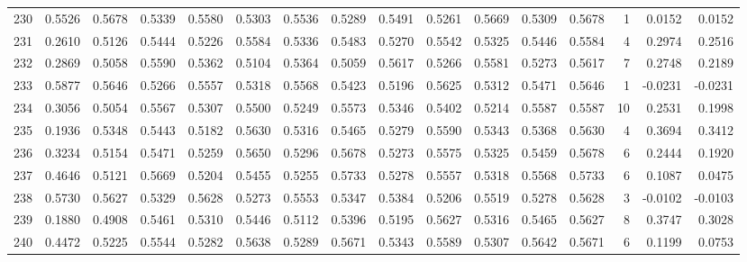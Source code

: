 \begin{tabular}{lrrrrrrrrrrrrrrr}
230 &      0.5526 &  0.5678 &  0.5339 &  0.5580 &  0.5303 &  0.5536 &  0.5289 &  0.5491 &  0.5261 &  0.5669 &   0.5309 &     0.5678 &      1 &                    0.0152 &                     0.0152 \\
231 &      0.2610 &  0.5126 &  0.5444 &  0.5226 &  0.5584 &  0.5336 &  0.5483 &  0.5270 &  0.5542 &  0.5325 &   0.5446 &     0.5584 &      4 &                    0.2974 &                     0.2516 \\
232 &      0.2869 &  0.5058 &  0.5590 &  0.5362 &  0.5104 &  0.5364 &  0.5059 &  0.5617 &  0.5266 &  0.5581 &   0.5273 &     0.5617 &      7 &                    0.2748 &                     0.2189 \\
233 &      0.5877 &  0.5646 &  0.5266 &  0.5557 &  0.5318 &  0.5568 &  0.5423 &  0.5196 &  0.5625 &  0.5312 &   0.5471 &     0.5646 &      1 &                   -0.0231 &                    -0.0231 \\
234 &      0.3056 &  0.5054 &  0.5567 &  0.5307 &  0.5500 &  0.5249 &  0.5573 &  0.5346 &  0.5402 &  0.5214 &   0.5587 &     0.5587 &     10 &                    0.2531 &                     0.1998 \\
235 &      0.1936 &  0.5348 &  0.5443 &  0.5182 &  0.5630 &  0.5316 &  0.5465 &  0.5279 &  0.5590 &  0.5343 &   0.5368 &     0.5630 &      4 &                    0.3694 &                     0.3412 \\
236 &      0.3234 &  0.5154 &  0.5471 &  0.5259 &  0.5650 &  0.5296 &  0.5678 &  0.5273 &  0.5575 &  0.5325 &   0.5459 &     0.5678 &      6 &                    0.2444 &                     0.1920 \\
237 &      0.4646 &  0.5121 &  0.5669 &  0.5204 &  0.5455 &  0.5255 &  0.5733 &  0.5278 &  0.5557 &  0.5318 &   0.5568 &     0.5733 &      6 &                    0.1087 &                     0.0475 \\
238 &      0.5730 &  0.5627 &  0.5329 &  0.5628 &  0.5273 &  0.5553 &  0.5347 &  0.5384 &  0.5206 &  0.5519 &   0.5278 &     0.5628 &      3 &                   -0.0102 &                    -0.0103 \\
239 &      0.1880 &  0.4908 &  0.5461 &  0.5310 &  0.5446 &  0.5112 &  0.5396 &  0.5195 &  0.5627 &  0.5316 &   0.5465 &     0.5627 &      8 &                    0.3747 &                     0.3028 \\
240 &      0.4472 &  0.5225 &  0.5544 &  0.5282 &  0.5638 &  0.5289 &  0.5671 &  0.5343 &  0.5589 &  0.5307 &   0.5642 &     0.5671 &      6 &                    0.1199 &                     0.0753 \\

\end{tabular}
